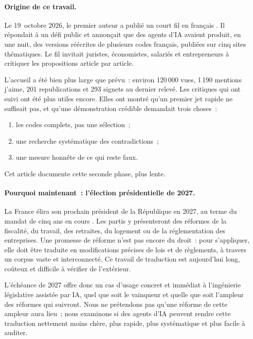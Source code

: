 \documentclass[11pt,a4paper]{article}
\begin{document}
\paragraph{Origine de ce travail.}
Le 19~octobre 2026, le premier auteur a publié un court fil en français \cite{fr:tweet}. Il répondait à un défi public et annonçait que des agents d'IA avaient produit, en une nuit, des versions réécrites de plusieurs codes français, publiées sur cinq sites thématiques. Le fil invitait juristes, économistes, salariés et entrepreneurs à critiquer les propositions article par article.

L'accueil a été bien plus large que prévu~: environ 120\,000 vues, 1\,190 mentions \og j'aime\fg{}, 201 republications et 293 signets au dernier relevé. Les critiques qui ont suivi ont été plus utiles encore. Elles ont montré qu'un premier jet rapide ne suffisait pas, et qu'une démonstration crédible demandait trois choses~:
\begin{enumerate}[label=(\roman*)]
  \item les codes complets, pas une sélection~;
  \item une recherche systématique des contradictions~;
  \item une mesure honnête de ce qui reste faux.
\end{enumerate}
Cet article documente cette seconde phase, plus lente.

\paragraph{Pourquoi maintenant~: l'élection présidentielle de 2027.}
La France élira son prochain président de la République en 2027, au terme du mandat de cinq ans en cours \cite{fr:constitution}. Les partis y présenteront des réformes de la fiscalité, du travail, des retraites, du logement ou de la réglementation des entreprises. Une promesse de réforme n'est pas encore du droit~: pour s'appliquer, elle doit être traduite en modifications précises de lois et de règlements, à travers un corpus vaste et interconnecté. Ce travail de traduction est aujourd'hui long, coûteux et difficile à vérifier de l'extérieur.

L'échéance de 2027 offre donc un cas d'usage concret et immédiat à l'ingénierie législative assistée par IA, quel que soit le vainqueur et quelle que soit l'ampleur des réformes qui suivront. Nous ne prétendons pas qu'une réforme de cette ampleur aura lieu~; nous examinons si des agents d'IA peuvent rendre cette traduction nettement moins chère, plus rapide, plus systématique et plus facile à auditer.
\end{document}
